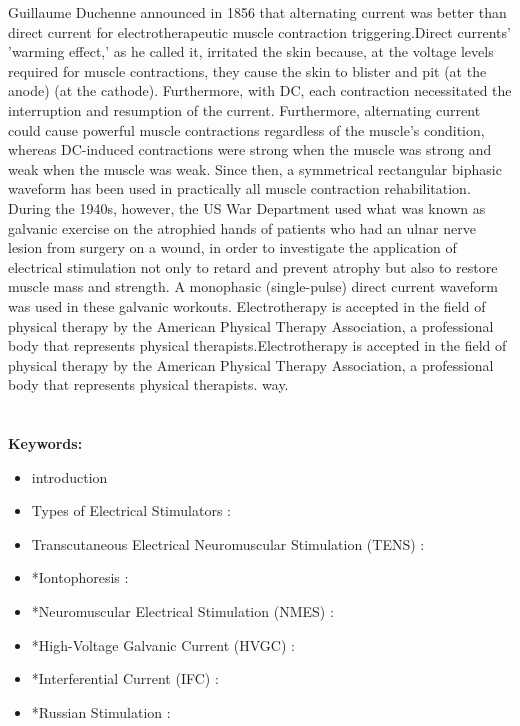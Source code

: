 \documentclass[11pt]{article}
\begin{document}
Guillaume Duchenne announced in 1856 that alternating current was better than direct current for electrotherapeutic muscle contraction triggering.Direct currents' 'warming effect,' as he called it, irritated the skin because, at the voltage levels required for muscle contractions, they cause the skin to blister and pit (at the anode) (at the cathode). Furthermore, with DC, each contraction necessitated the interruption and resumption of the current. Furthermore, alternating current could cause powerful muscle contractions regardless of the muscle's condition, whereas DC-induced contractions were strong when the muscle was strong and weak when the muscle was weak.
                                   Since then, a symmetrical rectangular biphasic waveform has been used in practically all muscle contraction rehabilitation. During the 1940s, however, the US War Department used what was known as galvanic exercise on the atrophied hands of patients who had an ulnar nerve lesion from surgery on a wound, in order to investigate the application of electrical stimulation not only to retard and prevent atrophy but also to restore muscle mass and strength. A monophasic (single-pulse) direct current waveform was used in these galvanic workouts. 
                                Electrotherapy is accepted in the field of physical therapy by the American Physical Therapy Association, a professional body that represents physical therapists.Electrotherapy is accepted in the field of physical therapy by the American Physical Therapy Association, a professional body that represents physical therapists. 
\newline
 way.\newline\\\\\\
\textbf{Keywords:}
\begin{itemize}
    \item introduction
    \item Types of Electrical Stimulators :
    \item Transcutaneous Electrical Neuromuscular Stimulation (TENS) :
    \item *Iontophoresis :
    \item *Neuromuscular Electrical Stimulation (NMES) : 
    \item *High-Voltage Galvanic Current (HVGC) : 
    \item *Interferential Current (IFC) :
    \item *Russian Stimulation :
\end{itemize}
\end{document}
